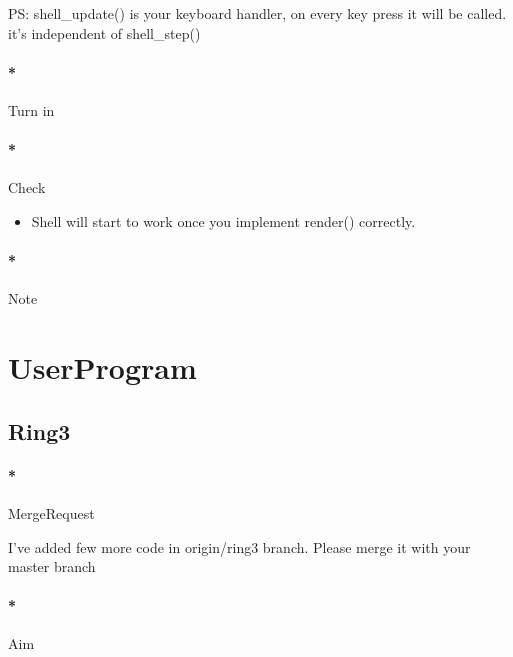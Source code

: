 \documentclass[]{article}
\newenvironment{Shaded}{}{}
\newcommand{\ExtensionTok}[1]{{#1}}
\newcommand{\NormalTok}[1]{{#1}}
\providecommand{\tightlist}{%
  \setlength{\itemsep}{0pt}\setlength{\parskip}{0pt}}
\let\oldparagraph\paragraph
\renewcommand{\paragraph}[1]{\oldparagraph{#1}\mbox{}}
\begin{document}
PS: shell\_update() is your keyboard handler, on every key press it will
be called. it's independent of shell\_step()

\paragraph*{Turn in}\label{turn-in-8}

\paragraph*{Check}\label{check-8}

\begin{itemize}
\tightlist
\item
  Shell will start to work once you implement render() correctly.
\end{itemize}

\paragraph*{Note}\label{note-10}

\section{UserProgram}\label{userprogram}

\subsection{Ring3}\label{ring3}

\paragraph*{MergeRequest}\label{mergerequest-9}

I've added few more code in origin/ring3 branch. Please merge it with
your master branch

\begin{Shaded}
\end{Shaded}

\paragraph*{Aim}\label{aim-9}
\end{document}
